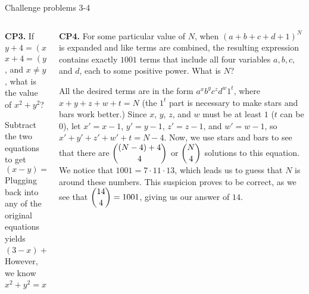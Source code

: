 \documentclass[9pt,aspectratio=169]{beamer}
\begin{document}
\begin{frame}{Challenge problems 3-4}
  \begin{columns}[T]
    \begin{column}{0.5\textwidth}
      \begin{problem}
        \textbf{CP3.} If $y+4 = (x-2)^2,$ $x+4 = (y-2)^2$, and $x \neq y$, what is the value of $x^2+y^2$?
      \end{problem}
      Subtract the two equations to get 
      \[(x-y)= (x+y-4)(y-x) \iff x+y=3.\] 
      Plugging back into any of the original equations yields 
      \[ (3-x)+4 = (x-2)^2 \iff x^2-3x=3.\] 
      However, we know $x^2+y^2= x^2+(3-x)^2= 2x^2-6x+9 = 2(x^2-3x)+9 = 2\cdot 3 + 9 = \boxed{15}$
    \end{column}
    \begin{column}{0.5\textwidth}
      \begin{problem}
        \textbf{CP4.} For some particular value of $N$, when $(a+b+c+d+1)^N$ is expanded and like terms are combined, the resulting expression contains exactly $1001$ terms that include all four variables $a, b,c,$ and $d$, each to some positive power. What is $N$?
      \end{problem}
      All the desired terms are in the form $a^xb^yc^zd^w1^t$, where $x + y + z + w + t = N$ (the $1^t$ part is necessary to make stars and bars work better.) Since $x$, $y$, $z$, and $w$ must be at least $1$ ($t$ can be $0$), let $x' = x - 1$, $y' = y - 1$, $z' = z - 1$, and $w' = w - 1$, so $x' + y' + z' + w' + t = N - 4$. Now, we use stars and bars to see that there are $\dbinom{(N-4)+4}{4}$ or $\dbinom{N}{4}$ solutions to this equation. We notice that $1001=7\cdot11\cdot13$, which leads us to guess that $N$ is around these numbers. This suspicion proves to be correct, as we see that $\dbinom{14}{4} = 1001$, giving us our answer of $\boxed{14}$.
    \end{column}
  \end{columns}
\end{frame}
\end{document}
